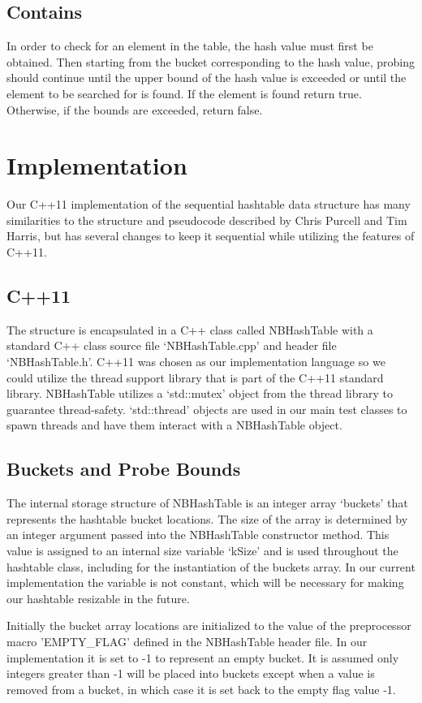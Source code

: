 \documentclass[journal]{IEEEtran}
\begin{document}
\subsection{Contains}
In order to check for an element in the table, the hash value must first be obtained. Then starting from the bucket corresponding to the hash value, probing should continue until the upper bound of the hash value is exceeded or until the element to be searched for is found. If the element is found return true. Otherwise, if the bounds are exceeded, return false.


\section{Implementation}

Our C++11 implementation of the sequential hashtable data structure has many similarities to the structure and pseudocode described by Chris Purcell and Tim Harris, but has several changes to keep it sequential while utilizing the features of C++11.

\subsection{C++11}
The structure is encapsulated in a C++ class called NBHashTable with a standard C++ class source file ‘NBHashTable.cpp’ and header file ‘NBHashTable.h’. C++11 was chosen as our implementation language so we could utilize the thread support library that is part of the C++11 standard library. NBHashTable utilizes a ‘std::mutex’ object from the thread library to guarantee thread-safety. ‘std::thread’ objects are used in our main test classes to spawn threads and have them interact with a NBHashTable object.

\subsection{Buckets and Probe Bounds}
The internal storage structure of NBHashTable is an integer array ‘buckets’ that represents the hashtable bucket locations. The size of the array is determined by an integer argument passed into the NBHashTable constructor method. This value is assigned to an internal size variable ‘kSize’ and is used throughout the hashtable class, including for the instantiation of the buckets array. In our current implementation the variable is not constant, which will be necessary for making our hashtable resizable in the future.

Initially the bucket array locations are initialized to the value of the preprocessor macro 'EMPTY\_FLAG' defined in the NBHashTable header file. In our implementation it is set to -1 to represent an empty bucket. It is assumed only integers greater than -1 will be placed into buckets except when a value is removed from a bucket, in which case it is set back to the empty flag value -1.
\end{document}
